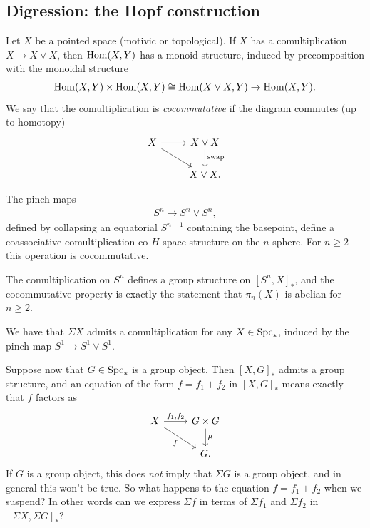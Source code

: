 \documentclass[11pt,openany]{book}
\begin{document}
\subsection{Digression: the Hopf construction}

Let $X$ be a pointed space (motivic or topological). If $X$ has a comultiplication $X \to X \vee X$, then $\mathrm{Hom}(X,Y)$ has a monoid structure, induced by precomposition with the monoidal structure
\begin{align*}
    \mathrm{Hom}(X,Y) \times \mathrm{Hom}(X,Y) \cong \mathrm{Hom}(X \vee X,Y) \to \mathrm{Hom}(X,Y).
\end{align*}
%
We say that the comultiplication is \textit{cocommutative} if the diagram commutes (up to homotopy)
\[ \begin{tikzcd}
    X\rar\ar[dr] & X \vee X\dar["\text{swap}" right]\\
     & X\vee X.
\end{tikzcd} \]
%
\begin{example} The pinch maps
\begin{align*}
    S^n \to S^n \vee S^n,
\end{align*}
defined by collapsing an equatorial $S^{n-1}$ containing the basepoint, define a coassociative comultiplication co-$H$-space structure on the $n$-sphere. For $n\ge2$ this operation is cocommutative.
\end{example}

The comultiplication on $S^n$ defines a group structure on $\left[ S^n,X \right]_\ast$, and the cocommutative property is exactly the statement that $\pi_n(X)$ is abelian for $n\ge 2$.

\begin{example} We have that $\Sigma X$ admits a comultiplication for any $X \in \mathrm{Spc}_\ast$, induced by the pinch map $S^1 \to S^1 \vee S^1$.
\end{example}

Suppose now that $G \in \mathrm{Spc}_\ast$ is a group object. Then $\left[ X,G \right]_\ast$ admits a group structure, and an equation of the form $f = f_1 + f_2$ in $\left[ X,G \right]_\ast$ means exactly that $f$ factors as
\[ \begin{tikzcd}
    X\rar["{f_1,f_2}" above]\ar[dr,"f" below left] & G \times G\dar["\mu" right]\\
     & G.
\end{tikzcd} \]
%
If $G$ is a group object, this does \textit{not} imply that $\Sigma G$ is a group object, and in general this won't be true. So what happens to the equation $f = f_1 + f_2$ when we suspend? In other words can we express $\Sigma f$ in terms of $\Sigma f_1$ and $\Sigma f_2$ in $\left[ \Sigma X, \Sigma G \right]_\ast$?
\end{document}
